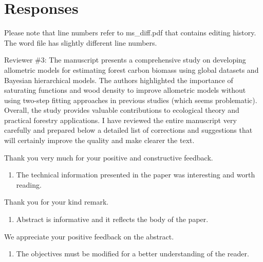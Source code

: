 \documentclass[
  12pt,
  letterpaper,
  DIV=11,
  numbers=noendperiod]{scrartcl}
\providecommand{\tightlist}{%
  \setlength{\itemsep}{0pt}\setlength{\parskip}{0pt}}\usepackage{longtable,booktabs,array}
\renewenvironment{quote}
  {\begin{customblockquote}\color{blockquote-text}\ignorespaces}
  {\end{customblockquote}}
\begin{document}
\section{Responses}\label{responses}

Please note that line numbers refer to ms\_diff.pdf that contains
editing history. The word file has slightly different line numbers.

\begin{quote}
Reviewer \#3: The manuscript presents a comprehensive study on
developing allometric models for estimating forest carbon biomass using
global datasets and Bayesian hierarchical models. The authors
highlighted the importance of saturating functions and wood density to
improve allometric models without using two-step fitting approaches in
previous studies (which seems problematic). Overall, the study provides
valuable contributions to ecological theory and practical forestry
applications. I have reviewed the entire manuscript very carefully and
prepared below a detailed list of corrections and suggestions that will
certainly improve the quality and make clearer the text.
\end{quote}

Thank you very much for your positive and constructive feedback.

\begin{quote}
\begin{enumerate}
\def\labelenumi{\arabic{enumi})}
\tightlist
\item
  The technical information presented in the paper was interesting and
  worth reading.
\end{enumerate}
\end{quote}

Thank you for your kind remark.

\begin{quote}
\begin{enumerate}
\def\labelenumi{\arabic{enumi})}
\setcounter{enumi}{1}
\tightlist
\item
  Abstract is informative and it reflects the body of the paper.
\end{enumerate}
\end{quote}

We appreciate your positive feedback on the abstract.

\begin{quote}
\begin{enumerate}
\def\labelenumi{\arabic{enumi})}
\setcounter{enumi}{2}
\tightlist
\item
  The objectives must be modified for a better understanding of the
  reader.
\end{enumerate}
\end{quote}
\end{document}
